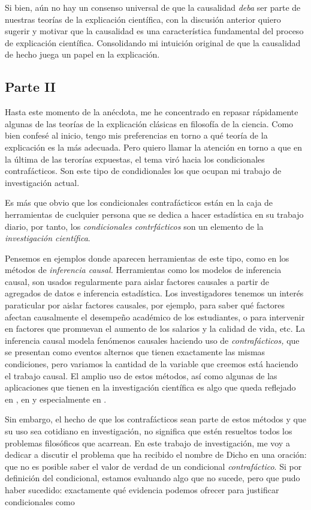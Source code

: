 Si bien, aún no hay un consenso universal de que la causalidad
\emph{deba} ser parte de nuestras teorías de la explicación
científica, con la discusión anterior quiero sugerir y motivar que la
causalidad es una característica fundamental del proceso de
explicación científica. Consolidando mi intuición original de que la
causalidad de hecho juega un papel en la explicación.

\subsection{Parte II}

\noindent Hasta este momento de la anécdota, me he concentrado en repasar
rápidamente algunas de las teorías de la explicación clásicas en
filosofía de la ciencia. Como bien confesé al inicio, tengo mis
preferencias en torno a qué teoría de la explicación es la más
adecuada. Pero quiero llamar la atención en torno a que en la última
de las terorías expuestas, el tema viró hacia los condicionales
contrafácticos. Son este tipo de condidionales los que ocupan mi trabajo de investigación actual.

Es más que obvio que los condicionales contrafácticos están en la
caja de herramientas de cuclquier persona que se dedica a hacer
estadística en su trabajo diario, por tanto, los \emph{condicionales
	contrfácticos} son un elemento de la \emph{investigación científica}.

Pensemos en ejemplos donde aparecen herramientas de este tipo, como
en los métodos de \emph{inferencia causal. } Herramientas como los
modelos de inferencia causal, son usados regularmente para aislar
factores causales a partir de agregados de datos e inferencia
estadística. Los investigadores tenemos un interés paraticular por
aislar factores causales, por ejemplo, para saber qué factores
afectan causalmente el desempeño académico de los estudiantes, o para
intervenir en factores que promuevan el aumento de los salarios y la
calidad de vida, etc. La inferencia causal modela fenómenos causales
haciendo uso de \emph {contrafácticos,} que se presentan como eventos
alternos que tienen exactamente las mismas condiciones, pero variamos
la cantidad de la variable que creemos está haciendo el trabajo
causal. El amplio uso de estos métodos, así como algunas de las
aplicaciones que tienen en la investigación científica es algo que
queda reflejado en \parencite {Pearl2016}, en \parencite{Pearl2018} y
especialmente en \parencite {llaudet2023}.

Sin embargo, el hecho de que los contrafácticos sean parte de estos
métodos y que su uso sea cotidiano en investigación, no significa que
estén resueltos todos los problemas filosóficos que acarrean. En este trabajo de investigación, me voy a dedicar a discutir el problema que ha recibido el nombre de  Dicho en una oración: que no es posible saber el valor de verdad de un
condicional \emph {contrafáctico}. Si por definición del condicional, estamos evaluando algo que no sucede, pero que pudo haber sucedido: exactamente qué evidencia podemos ofrecer para justificar condicionales como 

